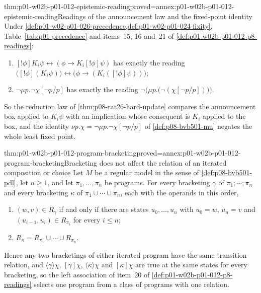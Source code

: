 \begin{hblemma}{thm:p01-w02b-p01-012-epistemic-reading}{proved=annex:p01-w02b-p01-012-epistemic-reading}{Readings of the announcement law and the fixed-point identity}
Under \cref{def:p01-w02-p01-026-precedence,def:p01-w02-p01-024-fixity},
Table~\ref{tab:p01-precedence} and items~15, 16 and~21 of
\cref{def:p01-w02b-p01-012-p8-readings}:
\begin{enumerate}
\item \([!\phi]K_i\psi\leftrightarrow(\phi\to K_i[!\phi]\psi)\) has exactly
  the reading
  \(\bigl([!\phi](K_i\psi)\bigr)\leftrightarrow\bigl(\phi\to(K_i([!\phi]\psi))\bigr)\);
\item \(\neg\mu p.\neg\chi[\neg p/p]\) has exactly the reading
  \(\neg\bigl(\mu p.\bigl(\neg(\chi[\neg p/p])\bigr)\bigr)\).
\end{enumerate}
So the reduction law of \cref{thm:p08-rat26-hard-update} compares the
announcement box applied to \(K_i\psi\) with an implication whose
consequent is \(K_i\) applied to the box, and the identity
\(\nu p.\chi=\neg\mu p.\neg\chi[\neg p/p]\) of \cref{def:p08-bvb501-mu}
negates the whole least fixed point.
\end{hblemma}

\begin{hblemma}{thm:p01-w02b-p01-012-program-bracketing}{proved=annex:p01-w02b-p01-012-program-bracketing}{Bracketing does not affect the relation of an iterated composition or choice}
Let \(M\) be a regular model in the sense of \cref{def:p08-bvb501-pdl}, let
\(n\geq1\), and let \(\pi_1,\ldots,\pi_n\) be programs.  For every
bracketing \(\gamma\) of \(\pi_1;\cdots;\pi_n\) and every bracketing
\(\kappa\) of \(\pi_1\cup\cdots\cup\pi_n\), each with the operands in this
order,
\begin{enumerate}
\item \((w,v)\in R_\gamma\) if and only if there are states
  \(u_0,\ldots,u_n\) with \(u_0=w\), \(u_n=v\) and
  \((u_{i-1},u_i)\in R_{\pi_i}\) for every \(i\leq n\);
\item \(R_\kappa=R_{\pi_1}\cup\cdots\cup R_{\pi_n}\).
\end{enumerate}
Hence any two bracketings of either iterated program have the same
transition relation, and \(\langle\gamma\rangle\chi\), \([\gamma]\chi\),
\(\langle\kappa\rangle\chi\) and \([\kappa]\chi\) are true at the same
states for every bracketing, so the left association of item~20 of
\cref{def:p01-w02b-p01-012-p8-readings} selects one program from a class
of programs with one relation.
\end{hblemma}

